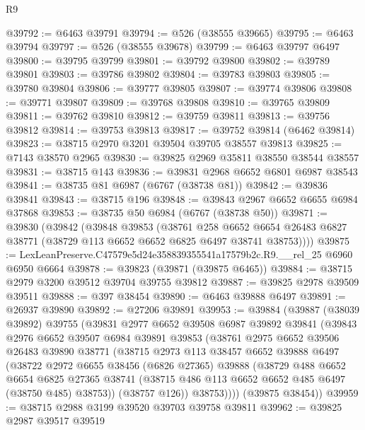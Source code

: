 \begin{lexlean}{R9}
\begin{coremodule}
@39792 := @6463 @39791
@39794 := @526 (@38555 @39665)
@39795 := @6463 @39794
@39797 := @526 (@38555 @39678)
@39799 := @6463 @39797 @6497
@39800 := @39795 @39799
@39801 := @39792 @39800
@39802 := @39789 @39801
@39803 := @39786 @39802
@39804 := @39783 @39803
@39805 := @39780 @39804
@39806 := @39777 @39805
@39807 := @39774 @39806
@39808 := @39771 @39807
@39809 := @39768 @39808
@39810 := @39765 @39809
@39811 := @39762 @39810
@39812 := @39759 @39811
@39813 := @39756 @39812
@39814 := @39753 @39813
@39817 := @39752 @39814 (@6462 @39814)
@39823 := @38715 @2970 @3201 @39504 @39705 @38557 @39813
@39825 := @7143 @38570 @2965
@39830 := @39825 @2969 @35811 @38550 @38544 @38557
@39831 := @38715 @143
@39836 := @39831 @2968 @6652 @6801 @6987 @38543
@39841 := @38735 @81 @6987 (@6767 (@38738 @81))
@39842 := @39836 @39841
@39843 := @38715 @196
@39848 := @39843 @2967 @6652 @6655 @6984 @37868
@39853 := @38735 @50 @6984 (@6767 (@38738 @50))
@39871 := @39830
    (@39842
      (@39848
        @39853
        (@38761
          @258
          @6652
          @6654
          @26483
          @6827
          @38771
          (@38729 @113 @6652 @6652 @6825 @6497 @38741 @38753))))
@39875 := LexLeanPreserve.C47579e5d24e358839355541a17579b2c.R9.__rel_25 @6960 @6950 @6664
@39878 := @39823 (@39871 (@39875 @6465))
@39884 := @38715 @2979 @3200 @39512 @39704 @39755 @39812
@39887 := @39825 @2978 @39509 @39511
@39888 := @397 @38454
@39890 := @6463 @39888 @6497
@39891 := @26937 @39890
@39892 := @27206 @39891
@39953 := @39884
    (@39887
      (@38039 @39892)
      @39755
      (@39831
        @2977
        @6652
        @39508
        @6987
        @39892
        @39841
        (@39843
          @2976
          @6652
          @39507
          @6984
          @39891
          @39853
          (@38761
            @2975
            @6652
            @39506
            @26483
            @39890
            @38771
            (@38715
              @2973
              @113
              @38457
              @6652
              @39888
              @6497
              (@38722
                @2972
                @6655
                @38456
                (@6826 @27365)
                @39888
                (@38729
                  @488
                  @6652
                  @6654
                  @6825
                  @27365
                  @38741
                  (@38715 @486 @113 @6652 @6652 @485 @6497 (@38750 @485) @38753))
                (@38757 @126))
              @38753))))
      (@39875 @38454))
@39959 := @38715 @2988 @3199 @39520 @39703 @39758 @39811
@39962 := @39825 @2987 @39517 @39519

\end{coremodule}
\end{lexlean}
